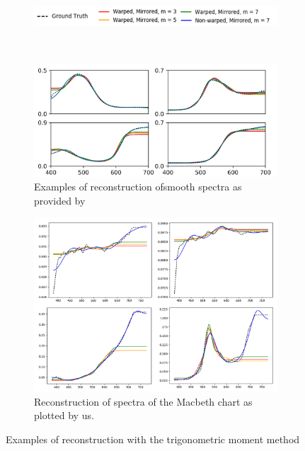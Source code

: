 \begin{figure}[t]
	\centering
	\begin{subfigure}[t]{0.70\textwidth}
		\includegraphics[width=\linewidth]{img/moments_reconstruction_legend.png}
	\end{subfigure} \\
	\vspace{1em}
	\begin{subfigure}[t]{0.45\textwidth}
		\includegraphics[width=\linewidth,height=0.2\textheight]{img/moments_reconstruction_Peters.png}
		\caption{Examples of reconstruction of\newline smooth spectra as provided by~\citet{trigonometricMomentsPaper}}
		\label{fig:momentsReconstructionPeters}
	\end{subfigure} \hspace{0.1em}
	\begin{subfigure}[t]{0.45\textwidth}
		\includegraphics[width=\linewidth]{img/moments_reconstruction_ours.png}
		\caption{Reconstruction of spectra of the Macbeth chart as plotted by us.}
		\label{fig:momentsReconstructionOur}
	\end{subfigure}
	\caption{Examples of reconstruction with the trigonometric moment method}
	\label{fig:momentsReconstructionComparison}
\end{figure}


